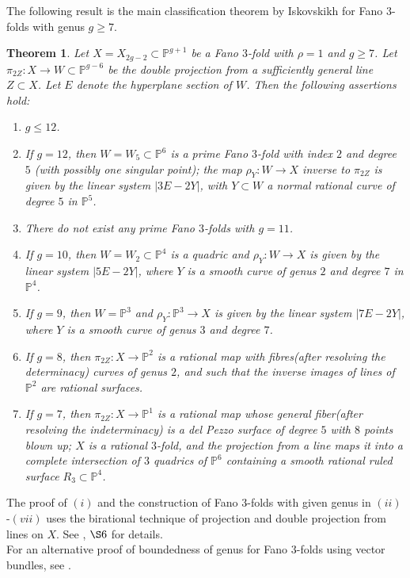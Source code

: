 \documentclass[11pt]{amsart}
\theoremstyle{plain}
\newtheorem{theorem}{Theorem}[section]
\theoremstyle{definition}
\theoremstyle{expl}
\begin{document}
The following result is the main classification theorem by Iskovskikh for Fano $3$-folds with genus $g\geq 7$. 
\begin{theorem}
    Let $X = X_{2g-2} \subset \mathbb{P}^{g+1}$ be a Fano $3$-fold with $\rho =1$ and $g\geq 7$. %
    Let $\pi_{2Z}: X \to W \subset \mathbb{P}^{g-6}$ be the double projection from a sufficiently general line $Z \subset X$. Let $E$ denote the hyperplane section of $W$. Then the following assertions hold:
    \begin{enumerate}
        \item[(i)] $g \leq 12$. 
        \item[(ii)] If $g=12$, then $W=W_5 \subset \mathbb{P}^6$ is a prime Fano $3$-fold with index $2$ and degree $5$ (with possibly one singular point); the map $\rho_Y :W \to X$ inverse to $\pi_{2Z}$ is given by the linear system $|3E-2Y|$, with $Y \subset W$ a normal rational curve of degree $5$ in $\mathbb{P}^5$.
        \item[(iii)] There do not exist any prime Fano $3$-folds with $g=11$. 
        \item[(iv)] If $g=10$, then $W= W_2 \subset \mathbb{P}^4$ is a quadric and $\rho_Y : W \to X$ is given by the linear system $|5E-2Y|$, where $Y$ is a smooth curve of genus $2$ and degree $7$ in $\mathbb{P}^4$.
        \item[(v)] If $g=9$, then $W= \mathbb{P}^3$ and $\rho_Y : \mathbb{P}^3 \to X$ is given by the linear system $|7E-2Y|$, where $Y$ is a smooth curve of genus $3$ and degree $7$.
        \item[(vi)] If $g=8$, then $\pi_{2Z}: X \to \mathbb{P}^2$ is a rational map with fibres(after resolving the determinacy) curves of genus $2$, and such that the inverse images of lines of $\mathbb{P}^2$ are rational surfaces.
        \item[(vii)] If $g=7$, then $\pi_{2Z}: X \to \mathbb{P}^1$ is a rational map whose general fiber(after resolving the indeterminacy) is a del Pezzo surface of degree $5$ with $8$ points blown up; $X$ is a rational $3$-fold, and the projection from a line maps it into a complete intersection of $3$ quadrics of $\mathbb{P}^6$ containing a smooth rational ruled surface $R_3 \subset \mathbb{P}^4$.
        \end{enumerate}
\end{theorem}
The proof of $(i)$ and the construction of Fano $3$-folds with given genus in $(ii)$-$(vii)$ uses the birational technique of projection and double projection from lines on $X$. See \cite{Isk78}, $\S 6$ for details.\\
For an alternative proof of boundedness of genus for Fano $3$-folds using vector bundles, see \cite{Muk92}.
	    
\end{document}
